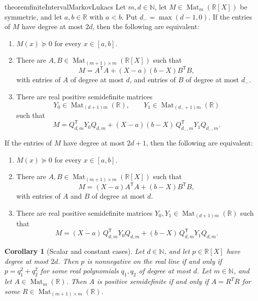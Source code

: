\documentclass[uplatex,dvipdfmx]{jsarticle}
\newcommand{\Poly}{\mathbb{R}[X]}
\newcommand{\Mat}{\operatorname{Mat}}
\newcommand{\psd}{\succeq 0}
\theoremstyle{matrixsosdefinition}
\newtheorem{corollary}[theorem]{Corollary}
\begin{document}
\begin{restatable}{theorem}{finiteIntervalMarkovLukacs}
  Let \(m,d\in\mathbb{N}\), let \(M\in\Mat_m(\Poly)\) be symmetric, and let
  \(a,b\in\mathbb{R}\) with \(a<b\).
  Put \(d_-=\max(d-1,0)\).
  If the entries of \(M\) have degree at most \(2d\), then the following are
  equivalent:
  \begin{enumerate}[label=(E\arabic*)]
    \item \(M(x)\psd\) for every \(x\in[a,b]\).
    \item There are \(A,B\in\Mat_{(m+1)\times m}(\Poly)\) such that
      \[
        M=A^{\mathsf T}A+(X-a)(b-X)B^{\mathsf T}B,
      \]
      with entries of \(A\) of degree at most \(d\), and entries of \(B\) of
      degree at most \(d_-\).
    \item There are real positive semidefinite matrices
      \[
        Y_0\in\Mat_{(d+1)m}(\mathbb{R}),\qquad
        Y_1\in\Mat_{(d_-+1)m}(\mathbb{R})
      \]
      such that
      \[
        M =
        Q_{d,m}^{\mathsf T}Y_0Q_{d,m}
        +(X-a)(b-X)\,Q_{d_-,m}^{\mathsf T}Y_1Q_{d_-,m}.
      \]
  \end{enumerate}
  If the entries of \(M\) have degree at most \(2d+1\), then the following are
  equivalent:
  \begin{enumerate}[label=(O\arabic*)]
    \item \(M(x)\psd\) for every \(x\in[a,b]\).
    \item There are \(A,B\in\Mat_{(m+1)\times m}(\Poly)\) such that
      \[
        M=(X-a)A^{\mathsf T}A+(b-X)B^{\mathsf T}B,
      \]
      with entries of \(A\) and \(B\) of degree at most \(d\).
    \item There are real positive semidefinite matrices
      \(Y_0,Y_1\in\Mat_{(d+1)m}(\mathbb{R})\) such that
      \[
        M =
        (X-a)\,Q_{d,m}^{\mathsf T}Y_0Q_{d,m}
        +(b-X)\,Q_{d,m}^{\mathsf T}Y_1Q_{d,m}.
      \]
  \end{enumerate}
\end{restatable}

\begin{corollary}[Scalar and constant cases]
  Let \(d\in\mathbb{N}\), and let \(p\in\mathbb{R}[X]\) have degree at most
  \(2d\).  Then \(p\) is nonnegative on the real line if and only if
  \(p=q_1^2+q_2^2\) for some real polynomials \(q_1,q_2\) of degree at most
  \(d\).
  Let \(m\in\mathbb{N}\), and let \(A\in\Mat_m(\mathbb{R})\).  Then \(A\) is
  positive semidefinite if and only if \(A=R^TR\) for some
  \(R\in\Mat_{(m+1)\times m}(\mathbb{R})\).
\end{corollary}
\end{document}

